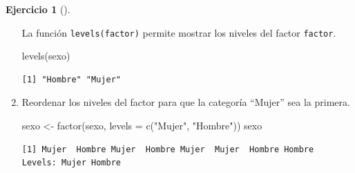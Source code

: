 \documentclass[
  a4paper,
]{scrreport}
\newenvironment{Shaded}{\begin{snugshade}}{\end{snugshade}}
\newcommand{\AttributeTok}[1]{\textcolor[rgb]{0.40,0.45,0.13}{#1}}
\newcommand{\FunctionTok}[1]{\textcolor[rgb]{0.28,0.35,0.67}{#1}}
\newcommand{\NormalTok}[1]{\textcolor[rgb]{0.00,0.23,0.31}{#1}}
\newcommand{\OtherTok}[1]{\textcolor[rgb]{0.00,0.23,0.31}{#1}}
\newcommand{\StringTok}[1]{\textcolor[rgb]{0.13,0.47,0.30}{#1}}
\theoremstyle{definition}
\newtheorem{exercise}{Ejercicio}[chapter]
\theoremstyle{remark}
\begin{document}
\begin{exercise}[]
\begin{enumerate}
\begin{tcolorbox}
  La función \texttt{levels(factor)} permite mostrar los niveles del
  factor \texttt{factor}.

\begin{Shaded}
\begin{Highlighting}[]
\FunctionTok{levels}\NormalTok{(sexo)}
\end{Highlighting}
\end{Shaded}

\begin{verbatim}
[1] "Hombre" "Mujer" 
\end{verbatim}

  \end{tcolorbox}
\item
  Reordenar los niveles del factor para que la categoría ``Mujer'' sea
  la primera.

  \begin{tcolorbox}[enhanced jigsaw, breakable, toptitle=1mm, colbacktitle=quarto-callout-tip-color!10!white, rightrule=.15mm, opacityback=0, opacitybacktitle=0.6, titlerule=0mm, coltitle=black, colframe=quarto-callout-tip-color-frame, colback=white, bottomtitle=1mm, leftrule=.75mm, toprule=.15mm, title=\textcolor{quarto-callout-tip-color}{\faLightbulb}\hspace{0.5em}{Solución}, arc=.35mm, bottomrule=.15mm, left=2mm]

\begin{Shaded}
\begin{Highlighting}[]
\NormalTok{sexo }\OtherTok{\textless{}{-}} \FunctionTok{factor}\NormalTok{(sexo, }\AttributeTok{levels =} \FunctionTok{c}\NormalTok{(}\StringTok{"Mujer"}\NormalTok{, }\StringTok{"Hombre"}\NormalTok{))}
\NormalTok{sexo}
\end{Highlighting}
\end{Shaded}

\begin{verbatim}
[1] Mujer  Hombre Mujer  Hombre Mujer  Mujer  Hombre Hombre
Levels: Mujer Hombre
\end{verbatim}

  \end{tcolorbox}
\end{enumerate}

\end{exercise}
\end{document}
